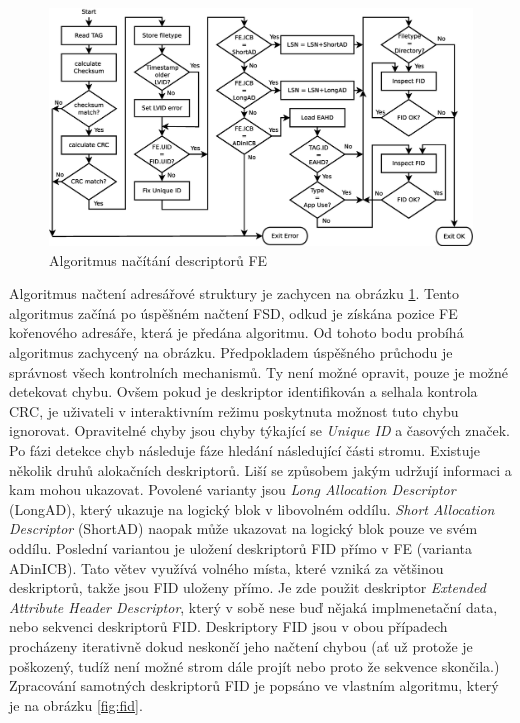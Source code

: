 \begin{figure}[] 
    \centering
    \includegraphics[scale=0.36]{obrazky/get-file.eps}
    \caption{Algoritmus načítání descriptorů FE}
    \label{fig:files}
\end{figure}Algoritmus načtení adresářové struktury je zachycen na obrázku \ref{fig:files}. Tento algoritmus začíná po úspěšném načtení FSD, odkud je získána pozice FE kořenového adresáře, která je předána algoritmu. Od tohoto bodu probíhá algoritmus zachycený na obrázku. Předpokladem úspěšného průchodu je správnost všech kontrolních mechanismů. Ty není možné opravit, pouze je možné detekovat chybu. Ovšem pokud je deskriptor identifikován a selhala kontrola CRC, je uživateli v interaktivním režimu poskytnuta možnost tuto chybu ignorovat. Opravitelné chyby jsou chyby týkající se \textit{Unique ID} a časových značek. Po fázi detekce chyb následuje fáze hledání následující části stromu. Existuje několik druhů alokačních deskriptorů. Liší se způsobem jakým udržují informaci a kam mohou ukazovat. Povolené varianty jsou \textit{Long Allocation Descriptor} (LongAD), který ukazuje na logický blok v libovolném oddílu. \textit{Short Allocation Descriptor} (ShortAD) naopak může ukazovat na logický blok pouze ve svém oddílu. Poslední variantou je uložení deskriptorů FID přímo v FE (varianta ADinICB). Tato větev využívá volného místa, které vzniká za většinou deskriptorů, takže jsou FID uloženy přímo. Je zde použit deskriptor \textit{Extended Attribute Header Descriptor}, který v sobě nese buď nějaká implmenetační data, nebo sekvenci deskriptorů FID. Deskriptory FID jsou v obou případech procházeny iterativně dokud neskončí jeho načtení chybou (ať už protože je poškozený, tudíž není možné strom dále projít nebo proto že sekvence skončila.) Zpracování samotných deskriptorů FID je popsáno ve vlastním algoritmu, který je na obrázku \ref{fig:fid}.\\
